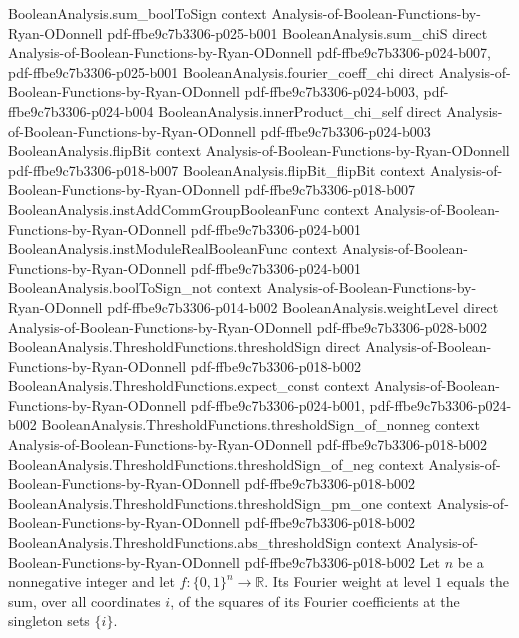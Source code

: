 \begin{lemma}
  {BooleanAnalysis.sum_boolToSign}
  {context}
  {Analysis-of-Boolean-Functions-by-Ryan-ODonnell}
  {pdf-ffbe9c7b3306-p025-b001}
\proofstep
  {BooleanAnalysis.sum_chiS}
  {direct}
  {Analysis-of-Boolean-Functions-by-Ryan-ODonnell}
  {pdf-ffbe9c7b3306-p024-b007,
    pdf-ffbe9c7b3306-p025-b001}
\proofstep
  {BooleanAnalysis.fourier_coeff_chi}
  {direct}
  {Analysis-of-Boolean-Functions-by-Ryan-ODonnell}
  {pdf-ffbe9c7b3306-p024-b003,
    pdf-ffbe9c7b3306-p024-b004}
\proofstep
  {BooleanAnalysis.innerProduct_chi_self}
  {direct}
  {Analysis-of-Boolean-Functions-by-Ryan-ODonnell}
  {pdf-ffbe9c7b3306-p024-b003}
\proofstep
  {BooleanAnalysis.flipBit}
  {context}
  {Analysis-of-Boolean-Functions-by-Ryan-ODonnell}
  {pdf-ffbe9c7b3306-p018-b007}
\proofstep
  {BooleanAnalysis.flipBit_flipBit}
  {context}
  {Analysis-of-Boolean-Functions-by-Ryan-ODonnell}
  {pdf-ffbe9c7b3306-p018-b007}
\proofstep
  {BooleanAnalysis.instAddCommGroupBooleanFunc}
  {context}
  {Analysis-of-Boolean-Functions-by-Ryan-ODonnell}
  {pdf-ffbe9c7b3306-p024-b001}
\proofstep
  {BooleanAnalysis.instModuleRealBooleanFunc}
  {context}
  {Analysis-of-Boolean-Functions-by-Ryan-ODonnell}
  {pdf-ffbe9c7b3306-p024-b001}
\proofstep
  {BooleanAnalysis.boolToSign_not}
  {context}
  {Analysis-of-Boolean-Functions-by-Ryan-ODonnell}
  {pdf-ffbe9c7b3306-p014-b002}
\proofstep
  {BooleanAnalysis.weightLevel}
  {direct}
  {Analysis-of-Boolean-Functions-by-Ryan-ODonnell}
  {pdf-ffbe9c7b3306-p028-b002}
\proofstep
  {BooleanAnalysis.ThresholdFunctions.thresholdSign}
  {direct}
  {Analysis-of-Boolean-Functions-by-Ryan-ODonnell}
  {pdf-ffbe9c7b3306-p018-b002}
\proofstep
  {BooleanAnalysis.ThresholdFunctions.expect_const}
  {context}
  {Analysis-of-Boolean-Functions-by-Ryan-ODonnell}
  {pdf-ffbe9c7b3306-p024-b001,
    pdf-ffbe9c7b3306-p024-b002}
\proofstep
  {BooleanAnalysis.ThresholdFunctions.thresholdSign_of_nonneg}
  {context}
  {Analysis-of-Boolean-Functions-by-Ryan-ODonnell}
  {pdf-ffbe9c7b3306-p018-b002}
\proofstep
  {BooleanAnalysis.ThresholdFunctions.thresholdSign_of_neg}
  {context}
  {Analysis-of-Boolean-Functions-by-Ryan-ODonnell}
  {pdf-ffbe9c7b3306-p018-b002}
\proofstep
  {BooleanAnalysis.ThresholdFunctions.thresholdSign_pm_one}
  {context}
  {Analysis-of-Boolean-Functions-by-Ryan-ODonnell}
  {pdf-ffbe9c7b3306-p018-b002}
\proofstep
  {BooleanAnalysis.ThresholdFunctions.abs_thresholdSign}
  {context}
  {Analysis-of-Boolean-Functions-by-Ryan-ODonnell}
  {pdf-ffbe9c7b3306-p018-b002}
Let $n$ be a nonnegative integer and let $f:\{0,1\}^n\to\mathbb R$. Its Fourier weight
at level $1$ equals the sum, over all coordinates $i$, of the squares of its Fourier
coefficients at the singleton sets $\{i\}$.
\end{lemma}

